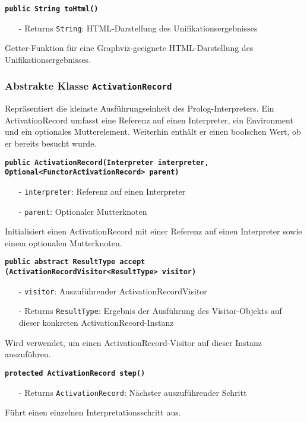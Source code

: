 \documentclass[parskip=full,11pt,twoside]{scrartcl}
\begin{document}
\textbf{\texttt{public String toHtml()}}
\begin{itemize}[noitemsep]
	\item[-] Returns \texttt{String}: HTML-Darstellung des Unifikationsergebnisses
\end{itemize}
Getter-Funktion für eine Graphviz-geeignete HTML-Darstellung des Unifikationsergebnisses.

\subsubsection{Abstrakte Klasse \texttt{ActivationRecord}}
Repräsentiert die kleinste Ausführungseinheit des Prolog-Interpreters. Ein ActivationRecord umfasst eine Referenz auf einen Interpreter, ein Environment und ein optionales Mutterelement. Weiterhin enthält er einen boolschen Wert, ob er bereits besucht wurde.

\textbf{\texttt{public ActivationRecord(Interpreter interpreter,\\Optional<FunctorActivationRecord> parent)}}
\begin{itemize}[noitemsep]
	\item[-] \texttt{interpreter}: Referenz auf einen Interpreter
	\item[-] \texttt{parent}: Optionaler Mutterknoten
\end{itemize}
Initialisiert einen ActivationRecord mit einer Referenz auf einen Interpreter sowie einem optionalen Mutterknoten.

\textbf{\texttt{public abstract ResultType accept\\(ActivationRecordVisitor<ResultType> visitor)}}
\begin{itemize}[noitemsep]
	\item[-] \texttt{visitor}: Auszuführender ActivationRecordVisitor
	\item[-] Returns \texttt{ResultType}: Ergebnis der Ausführung des Visitor-Objekts auf dieser konkreten ActivationRecord-Instanz
\end{itemize}
Wird verwendet, um einen ActivationRecord-Visitor auf dieser Instanz auszuführen.

\textbf{\texttt{protected ActivationRecord step()}}
\begin{itemize}[noitemsep]
	\item[-] Returns \texttt{ActivationRecord}: Nächster auszuführender Schritt
\end{itemize}
Führt einen einzelnen Interpretationsschritt aus.
\end{document}
